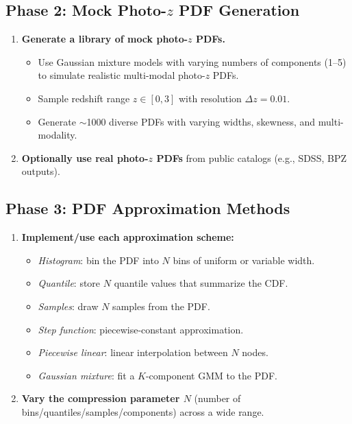 \documentclass[11pt,a4paper]{article}
\begin{document}
\subsection{Phase 2: Mock Photo-$z$ PDF Generation}
\begin{enumerate}[label=\textbf{2.\arabic*}]
  \item \textbf{Generate a library of mock photo-$z$ PDFs.}
    \begin{itemize}
      \item Use Gaussian mixture models with varying numbers of components (1--5) to simulate realistic multi-modal photo-$z$ PDFs.
      \item Sample redshift range $z \in [0, 3]$ with resolution $\Delta z = 0.01$.
      \item Generate $\sim$1000 diverse PDFs with varying widths, skewness, and multi-modality.
    \end{itemize}
  \item \textbf{Optionally use real photo-$z$ PDFs} from public catalogs (e.g., SDSS, BPZ outputs).
\end{enumerate}

\subsection{Phase 3: PDF Approximation Methods}
\begin{enumerate}[label=\textbf{3.\arabic*}]
  \item \textbf{Implement/use each approximation scheme:}
    \begin{itemize}
      \item \emph{Histogram}: bin the PDF into $N$ bins of uniform or variable width.
      \item \emph{Quantile}: store $N$ quantile values that summarize the CDF.
      \item \emph{Samples}: draw $N$ samples from the PDF.
      \item \emph{Step function}: piecewise-constant approximation.
      \item \emph{Piecewise linear}: linear interpolation between $N$ nodes.
      \item \emph{Gaussian mixture}: fit a $K$-component GMM to the PDF.
    \end{itemize}
  \item \textbf{Vary the compression parameter $N$} (number of bins/quantiles/samples/components) across a wide range.
\end{enumerate}
\end{document}
